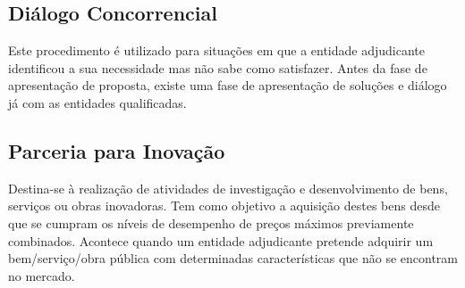 \documentclass{book}
\begin{document}
	
	\subsection*{Diálogo Concorrencial}
	Este procedimento é utilizado para situações em que a entidade adjudicante identificou a sua necessidade mas não sabe como satisfazer. Antes da fase de apresentação de proposta, existe uma fase de apresentação de soluções e diálogo já com as entidades qualificadas. \\
	
	
	\subsection*{Parceria para Inovação}
	Destina-se à realização de atividades de investigação e desenvolvimento de bens, serviços ou obras inovadoras. Tem como objetivo a aquisição destes bens desde que se cumpram os níveis de desempenho de preços máximos previamente combinados. Acontece quando um entidade adjudicante pretende adquirir um bem/serviço/obra pública com determinadas características que não se encontram no mercado. 
	
	
	
	
	
\end{document}
